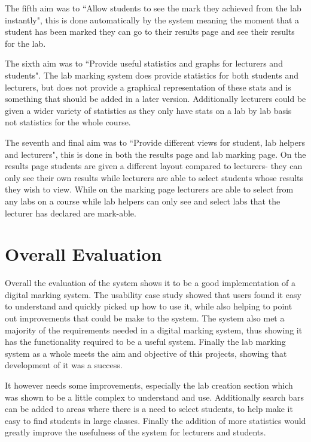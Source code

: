 \documentclass[11pt]{report}
\begin{document}
The fifth aim was to ``Allow students to see the mark they achieved from the lab instantly", this is done automatically by the system meaning the moment that a student has been marked they can go to their results page and see their results for the lab.

The sixth aim was to ``Provide useful statistics and graphs for lecturers and students". The lab marking system does provide statistics for both students and lecturers, but does not provide a graphical representation of these stats and is something that should be added in a later version. Additionally lecturers could be given a wider variety of statistics as they only have stats on a lab by lab basis not statistics for the whole course.

The seventh and final aim was to ``Provide different views for student, lab helpers and lecturers", this is done in both the results page and lab marking page. On the results page students are given a different layout compared to lecturers- they can only see their own results while lecturers are able to select students whose results they wish to view. While on the marking page lecturers are able to select from any labs on a course while lab helpers can only see and select labs that the lecturer has declared are mark-able.



\section{Overall Evaluation}

Overall the evaluation of the system shows it to be a good implementation of a digital marking system. The usability case study showed that users found it easy to understand and quickly picked up how to use it, while also helping to point out improvements that could be make to the system. The system also met a majority of the requirements needed in a digital marking system, thus showing it has the functionality required to be a useful system. Finally the lab marking system as a whole meets the aim and objective of this projects, showing that development of it was a success.

It however needs some improvements, especially the lab creation section which was shown to be a little complex to understand and use. Additionally search bars can be added to areas where there is a need to select students, to help make it easy to find students in large classes. Finally the addition of more statistics would greatly improve the usefulness of the system for lecturers and students.
\end{document}
